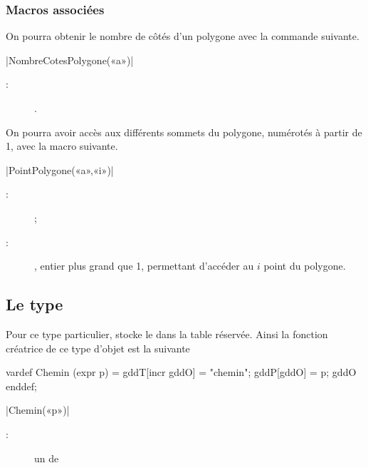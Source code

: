 \documentclass[a4paper,french]{article}
\begin{document}
\subsubsection{Macros associées}

On pourra obtenir le nombre de côtés d'un polygone avec la commande suivante.

\begin{colourband}
\macro|NombreCotesPolygone(«a»)|
\begin{description}
  \item[:]  .
\end{description}
\end{colourband}
\bigskip

On pourra avoir accès aux différents sommets du polygone, numérotés à partir de
1, avec la macro suivante.

\begin{colourband}
\macro|PointPolygone(«a»,«i»)|
\begin{description}
  \item[:]   ;
  \item[:] , entier plus grand que 1, permettant
  d'accéder au $i$\ieme{} point du polygone.
\end{description}
\end{colourband}
  \bigskip

\subsection{Le type } Pour ce type particulier, \mpgeomdd stocke
le  dans la table  réservée. Ainsi la fonction
créatrice de ce type d'objet est la suivante
\begin{mpcode}
vardef Chemin (expr p) =
gddT[incr gddO] = "chemin"; gddP[gddO] = p; gddO
enddef;
\end{mpcode}
\begin{colourband}
\macro|Chemin(«p»)|
\begin{description}
  \item[:] un  de \MP
\end{description}
\end{colourband}
\end{document}
